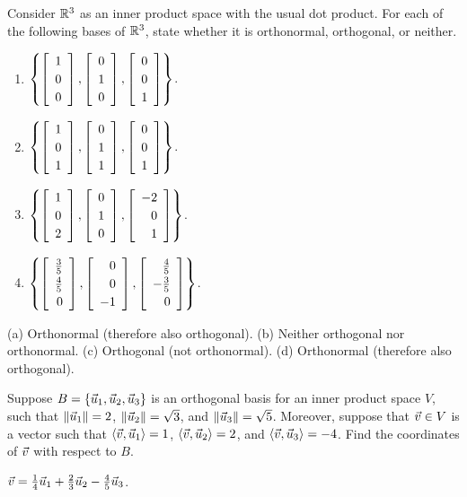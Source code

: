 \documentclass{ximera}
\begin{document}
\begin{exercise}
  Consider $\mathbb{R}^3$ as an inner product space with the usual dot
  product.  For each of the following bases of $\mathbb{R}^3$, state whether
  it is orthonormal, orthogonal, or neither.
  \begin{enumerate}
  \item $\set{
      \startmat{r} 1 \\ 0 \\ 0 \stopmat,
      \startmat{r} 0 \\ 1 \\ 0 \stopmat,
      \startmat{r} 0 \\ 0 \\ 1 \stopmat
    }$.
  \item $\set{
      \startmat{r} 1 \\ 0 \\ 1 \stopmat,
      \startmat{r} 0 \\ 1 \\ 1 \stopmat,
      \startmat{r} 0 \\ 0 \\ 1 \stopmat
    }$.
  \item $\set{
      \startmat{r}  1 \\ 0 \\ 2 \stopmat,
      \startmat{r}  0 \\ 1 \\ 0 \stopmat,
      \startmat{r} -2 \\ 0 \\ 1 \stopmat
    }$.
  \item $\def\arraystretch{1.2}
    \set{
      \startmat{r} \frac{3}{5} \\ \frac{4}{5} \\ 0 \stopmat,
      \startmat{r} 0 \\ 0 \\ -1 \stopmat,
      \startmat{r} \frac{4}{5} \\ -\frac{3}{5} \\ 0 \stopmat
    }$.
  \end{enumerate}
  \begin{solution}
    (a) Orthonormal (therefore also orthogonal). (b) Neither
    orthogonal nor orthonormal. (c) Orthogonal (not orthonormal). (d)
    Orthonormal (therefore also orthogonal).
  \end{solution}
\end{exercise}

\begin{exercise}
  Suppose $B=\left\{\vec{u}_1,\vec{u}_2,\vec{u}_3\right\}$ is an orthogonal
  basis for an inner product space $V$, such that
  $\left\|\vec{u}_1\right\|=2$, $\left\|\vec{u}_2\right\|=\sqrt{3}$, and
  $\left\|\vec{u}_3\right\|=\sqrt{5}$.  Moreover, suppose that
  $\vec{v}\in V$ is a vector such that
  $\langle \vec{v},\vec{u}_1 \rangle = 1$,
  $\langle \vec{v},\vec{u}_2 \rangle = 2$, and
  $\langle \vec{v},\vec{u}_3 \rangle = -4$.  Find the coordinates of
  $\vec{v}$ with respect to $B$.
  \begin{solution}
    $\vec{v} = \frac{1}{4}\vec{u}_1 + \frac{2}{3}\vec{u}_2 - \frac{4}{5}\vec{u}_3$.
  \end{solution}
\end{exercise}
\end{document}
